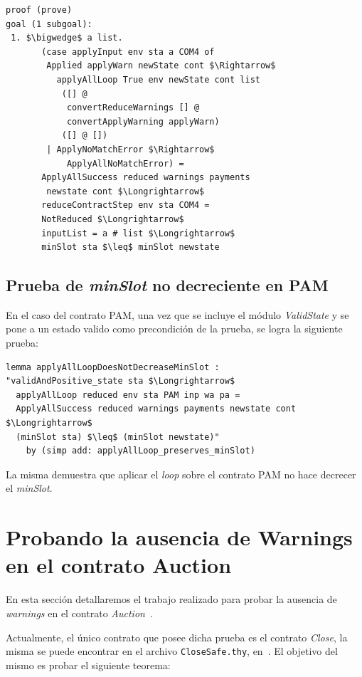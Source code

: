 \documentclass[12pt]{book}
\begin{document}
\begin{lstlisting}[style=Isabelle]
proof (prove)
goal (1 subgoal):
 1. $\bigwedge$ a list.
       (case applyInput env sta a COM4 of
        Applied applyWarn newState cont $\Rightarrow$
          applyAllLoop True env newState cont list
           ([] @
            convertReduceWarnings [] @
            convertApplyWarning applyWarn)
           ([] @ [])
        | ApplyNoMatchError $\Rightarrow$
            ApplyAllNoMatchError) =
       ApplyAllSuccess reduced warnings payments
        newstate cont $\Longrightarrow$
       reduceContractStep env sta COM4 =
       NotReduced $\Longrightarrow$
       inputList = a # list $\Longrightarrow$
       minSlot sta $\leq$ minSlot newstate
\end{lstlisting}

\subsection{Prueba de \textit{minSlot} no decreciente en PAM}

En el caso del contrato PAM, una vez que se incluye el módulo \textit{ValidState} y se pone a un estado valido como precondición de la prueba, se logra la siguiente prueba:

\begin{lstlisting}[style=Isabelle, caption=Prueba del lema de \textit{minSlot} para el contrato PAM]
lemma applyAllLoopDoesNotDecreaseMinSlot :
"validAndPositive_state sta $\Longrightarrow$
  applyAllLoop reduced env sta PAM inp wa pa = 
  ApplyAllSuccess reduced warnings payments newstate cont $\Longrightarrow$
  (minSlot sta) $\leq$ (minSlot newstate)"
    by (simp add: applyAllLoop_preserves_minSlot)
\end{lstlisting}

La misma demuestra que aplicar el \textit{loop} sobre el contrato PAM no hace decrecer el \textit{minSlot}.

\section{Probando la ausencia de Warnings en el contrato Auction}

En esta sección detallaremos el trabajo realizado para probar la ausencia de \textit{warnings} en el contrato \textit{Auction}~\cite{auction_haskell}.

Actualmente, el único contrato que posee dicha prueba es el contrato \textit{Close}, la misma se puede encontrar en el archivo \texttt{CloseSafe.thy}, en~\cite{marlowe-isabelle-repo}. El objetivo del mismo es probar el siguiente teorema:
\end{document}
